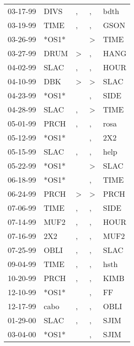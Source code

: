 \begin{supertabular}{lllll}
 03-17-99 &   DIVS &                , &             , &   bdth \\
 03-19-99 &   TIME &                , &             , &   GSON \\
 03-26-99 &  *OS1* &                  &  \textgreater &   TIME \\
 03-27-99 &   DRUM &     \textgreater &             , &   HANG \\
 04-02-99 &   SLAC &                , &             , &   HOUR \\
 04-10-99 &    DBK &     \textgreater &  \textgreater &   SLAC \\
 04-23-99 &  *OS1* &                  &             , &   SIDE \\
 04-28-99 &   SLAC &                , &  \textgreater &   TIME \\
 05-01-99 &   PRCH &                , &             , &   rosa \\
 05-12-99 &  *OS1* &                  &             , &    2X2 \\
 05-15-99 &   SLAC &                , &             , &   help \\
 05-22-99 &  *OS1* &                  &  \textgreater &   SLAC \\
 06-18-99 &  *OS1* &                  &             , &   TIME \\
 06-24-99 &   PRCH &     \textgreater &  \textgreater &   PRCH \\
 07-06-99 &   TIME &                , &             , &   SIDE \\
 07-14-99 &   MUF2 &                , &             , &   HOUR \\
 07-16-99 &    2X2 &                , &             , &   MUF2 \\
 07-25-99 &   OBLI &                , &             , &   SLAC \\
 09-04-99 &   TIME &                , &             , &   hsth \\
 10-20-99 &   PRCH &                , &             , &   KIMB \\
 12-10-99 &  *OS1* &                  &             , &     FF \\
 12-17-99 &   cabo &                , &             , &   OBLI \\
 01-29-00 &   SLAC &                , &             , &   SJIM \\
 03-04-00 &  *OS1* &                  &             , &   SJIM \\

\end{supertabular}
